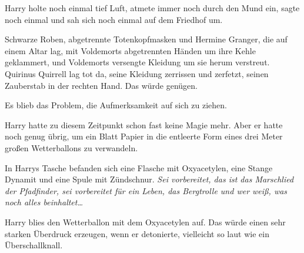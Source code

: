 Harry holte noch einmal tief Luft, atmete immer noch durch den Mund ein, sagte noch einmal  und sah sich noch einmal auf dem Friedhof um.

Schwarze Roben, abgetrennte Totenkopfmasken und Hermine Granger, die auf einem Altar lag, mit Voldemorts abgetrennten Händen um ihre Kehle geklammert, und Voldemorts versengte Kleidung um sie herum verstreut. Quirinus Quirrell lag tot da, seine Kleidung zerrissen und zerfetzt, seinen Zauberstab in der rechten Hand. Das würde genügen.

Es blieb das Problem, die Aufmerksamkeit auf sich zu ziehen.

Harry hatte zu diesem Zeitpunkt schon fast keine Magie mehr. Aber er hatte noch genug übrig, um ein Blatt Papier in die entleerte Form eines drei Meter großen Wetterballons zu verwandeln.

In Harrys Tasche befanden sich eine Flasche mit Oxyacetylen, eine Stange Dynamit und eine Spule mit Zündschnur.
\emph{Sei vorbereitet, das ist das Marschlied der Pfadfinder, sei vorbereitet für ein Leben, das Bergtrolle und wer weiß, was noch alles beinhaltet…}

Harry blies den Wetterballon mit dem Oxyacetylen auf. Das würde einen sehr starken Überdruck erzeugen, wenn er detonierte, vielleicht so laut wie ein Überschallknall.



